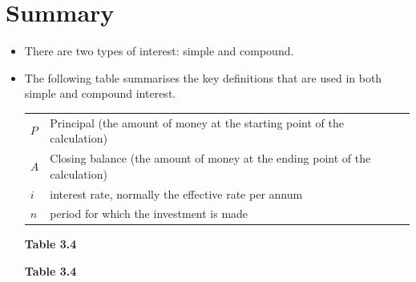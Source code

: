             \section{ Summary}
            \nopagebreak
            \label{m39335*eip-923}\begin{itemize}[noitemsep]
            \item There are two types of interest: simple and compound.\item The following table summarises the key definitions that are used in both simple and compound interest.
          \begin{table}
        \begin{center}
      \label{m39335*id75382}
    \noindent
      \tablelasttail{}
      \begin{xtabular}[t]{|l|l|}\hline
                  $P$
                 &
        Principal (the amount of money at the starting point of the calculation)%
     \tabularnewline{}
                  $A$
                 &
        Closing balance (the amount of money at the ending point of the calculation)%
     \tabularnewline{}
                  $i$
                 &
        interest rate, normally the effective rate per annum%
     \tabularnewline{}
                  $n$
                 &
        period for which the investment is made%
     \tabularnewline{}
    \end{xtabular}
      \end{center}
    \begin{center}{\small\bfseries Table 3.4}\end{center}
    \begin{caption}{\small\bfseries Table 3.4}\end{caption}

\end{table}
\end{itemize}
